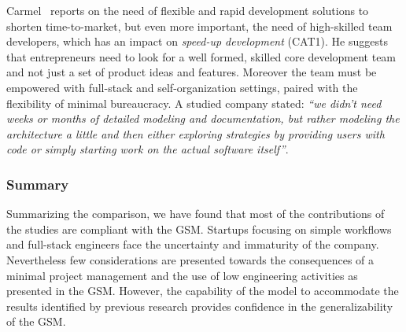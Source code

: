 \documentclass[10pt,journal,letterpaper,compsoc]{IEEEtran}
\begin{document}
Carmel~\cite{Camel1994a} reports on the need of flexible and rapid development
solutions to shorten time-to-market, but even more important, the need of 
high-skilled team developers, which has an impact on \textit{speed-up 
development} (CAT1). 
He suggests that entrepreneurs need to look for a well formed, skilled
core development team and not just a set of product ideas and features.
Moreover the team must be empowered with full-stack and self-organization
settings, paired with the flexibility of minimal bureaucracy. A studied company
stated: \textit{``we didn't need weeks or months of detailed modeling and
documentation, but rather modeling the architecture a little and then either
exploring strategies by providing users with code or simply starting work on
the actual software itself''}.



\subsubsection{Summary} Summarizing the comparison, we have found that most of
the contributions of the studies are compliant with the GSM. Startups
focusing on simple workflows and full-stack engineers face the uncertainty and
immaturity of the company. Nevertheless few considerations are presented towards
the consequences of a minimal project management and the use of low engineering
activities as presented in the GSM. However, the capability of the model
to accommodate the results identified by previous research provides
confidence in the generalizability of the GSM.
\end{document}
